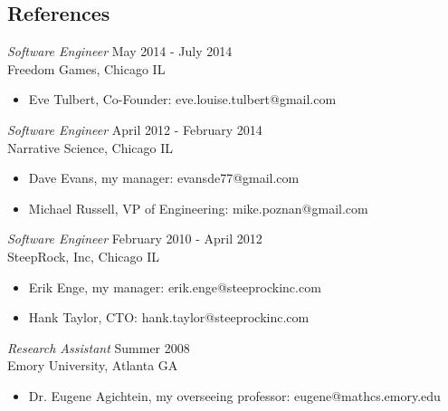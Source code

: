 \documentclass[line,margin]{res}
\begin{document}
\address{waltaskew@gmail.com}
\address{404-819-9796}

\begin{resume}
 
\section{References}
        {\sl Software Engineer} \hfill May 2014 - July 2014 \\
        Freedom Games, Chicago IL
        \begin{itemize}
          \item Eve Tulbert, Co-Founder: eve.louise.tulbert@gmail.com
        \end{itemize}
        {\sl Software Engineer} \hfill April 2012 - February 2014 \\
        Narrative Science, Chicago IL
        \begin{itemize} 
          \item Dave Evans, my manager: evansde77@gmail.com
          \item Michael Russell, VP of Engineering: mike.poznan@gmail.com
        \end{itemize}

        {\sl Software Engineer} \hfill February 2010 - April 2012 \\
        SteepRock, Inc, Chicago IL
        \begin{itemize}
          \item Erik Enge, my manager: erik.enge@steeprockinc.com
          \item Hank Taylor, CTO: hank.taylor@steeprockinc.com
        \end{itemize}

        {\sl Research Assistant} \hfill Summer 2008 \\
        Emory University, Atlanta GA
        \begin{itemize}
          \item Dr. Eugene Agichtein, my overseeing professor: eugene@mathcs.emory.edu
        \end{itemize}

\end{resume}
\end{document}
